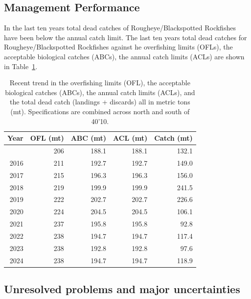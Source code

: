 \documentclass[
]{scrartcl}
\begin{document}
\subsection{Management Performance}\label{management-performance}

In the last ten years total dead catches of Rougheye/Blackspotted
Rockfishes have been below the annual catch limit. The last ten years
total dead catches for Rougheye/Blackspotted Rockfishes against he
overfishing limits (OFLs), the acceptable biological catches (ABCs), the
annual catch limits (ACLs) are shown in Table~\ref{tbl-es-management}.

\begingroup
\fontsize{9.0pt}{10.8pt}\selectfont

\begin{longtable}{rrrrr}

\caption{\label{tbl-es-management}Recent trend in the overfishing limits
(OFL), the acceptable biological catches (ABCs), the annual catch limits
(ACLs), and the total dead catch (landings + discards) all in metric
tons (mt). Specifications are combined across north and south of 40'10.}

\tabularnewline

\toprule
Year & OFL (mt) & ABC (mt) & ACL (mt) & Catch (mt) \\ 
\midrule\addlinespace[2.5pt]
2015 & 206 & 188.1 & 188.1 & 132.1 \\ 
2016 & 211 & 192.7 & 192.7 & 149.0 \\ 
2017 & 215 & 196.3 & 196.3 & 156.0 \\ 
2018 & 219 & 199.9 & 199.9 & 241.5 \\ 
2019 & 222 & 202.7 & 202.7 & 226.6 \\ 
2020 & 224 & 204.5 & 204.5 & 106.1 \\ 
2021 & 237 & 195.8 & 195.8 & 92.8 \\ 
2022 & 238 & 194.7 & 194.7 & 117.4 \\ 
2023 & 238 & 192.8 & 192.8 & 97.6 \\ 
2024 & 238 & 194.7 & 194.7 & 118.9 \\ 
\bottomrule

\end{longtable}

\endgroup

\subsection{Unresolved problems and major
uncertainties}\label{unresolved-problems-and-major-uncertainties}
\end{document}

